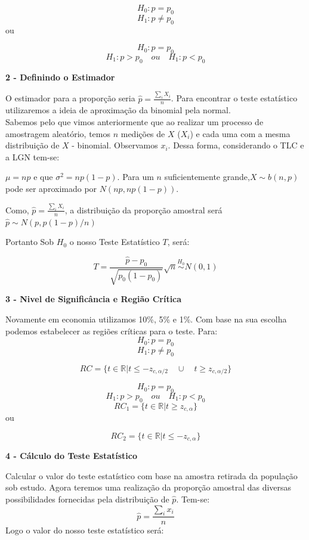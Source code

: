 \documentclass[
  letterpaper,
  DIV=11,
  numbers=noendperiod]{scrartcl}
\begin{document}
\[H_0: p=p_0\] \[H_1: p \neq p_0\] ou

\[H_0: p=p_0\] \[H_1: p >p_0 \quad ou \quad H_1: p<p_0\]

\vspace{0.5cm}

\textbf{2 - Definindo o Estimador}

O estimador para a proporção seria \(\hat{p}=\frac{\sum_i{X_i}}{n}\).
Para encontrar o teste estatístico utilizaremos a ideia de aproximação
da binomial pela normal.\\
Sabemos pelo que vimos anteriormente que ao realizar um processo de
amostragem aleatório, temos \(n\) medições de \(X\) (\(X_i\)) e cada uma
com a mesma distribuição de \(X\) - binomial. Observamos \(x_i\). Dessa
forma, considerando o TLC e a LGN tem-se:

\(\mu=np\) e que \(\sigma^2=np(1-p)\). Para um \(n\) suficientemente
grande,\(X \sim b(n,p)\) pode ser aproximado por \(N(np,np(1-p))\).

Como, \(\hat{p}=\frac{\sum_i{X_i}}{n}\), a distribuição da proporção
amostral será \(\hat{p} \sim N(p,p(1-p)/n)\)

Portanto Sob \(H_0\) o nosso Teste Estatístico \(T\), será:

\[T=\frac{\hat{p}-p_0}{\sqrt{p_0(1-p_0)}}\sqrt{n}\overset{H_0}{\sim} N(0,1)\]

\vspace{0.5cm}

\textbf{3 - Nivel de Significância e Região Crítica}

Novamente em economia utilizamos 10\%, 5\% e 1\%. Com base na sua
escolha podemos estabelecer as regiões críticas para o teste. Para:
\[H_0:  p=p_0\] \[H_1:  p \neq p_0\]

\[RC=\{t \in \mathbb{R} |t\leq - z_{c,\alpha/2} \quad \cup \quad t\geq  z_{c,\alpha/2}\}\]

\[H_0:  p=p_0\] \[H_1:  p >p_0 \quad ou \quad H_1: p<p_0\]
\[RC_1=\{t \in \mathbb{R} | t\geq  z_{c,\alpha}\}\] ou

\[RC_2=\{t \in \mathbb{R} |t\leq - z_{c,\alpha} \}\]

\vspace{0.5cm}

\textbf{4 - Cálculo do Teste Estatístico}

Calcular o valor do teste estatístico com base na amostra retirada da
população sob estudo. Agora teremos uma realização da proporção amostral
das diversas possibilidades fornecidas pela distribuição de \(\hat{p}\).
Tem-se: \[\hat{p}=\frac{\sum_i{x_i}}{n}\] Logo o valor do nosso teste
estatístico será:
\end{document}
